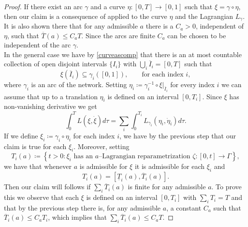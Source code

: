 \documentclass[11pt,a4paper,american]{article}
\newcommand{\ovI}{\overline I}
\newcommand{\ovT}{\overline T}
\begin{document}
    \begin{proof}
        If there exist an arc $\gamma$ and a curve $\eta:[0,T]\to[0,1]$ such that $\xi=\gamma\circ\eta$, then our claim is a consequence of \cite[Proposition 3.13 and Remark 3.17]{Davini07} applied to the curve $\eta$ and the Lagrangian $L_\gamma$. It is also shown there that for any admissible $a$ there is a $C_a>0$, independent of $\eta$, such that $\ovT(a)\le C_a T$. Since the arcs are finite $C_a$ can be chosen to be independent of the arc $\gamma$.\\
        In the general case we have by \cref{curveascomp} that there is an at most countable collection of open disjoint intervals $\{I_i\}$ with $\bigcup_i\ovI_i=[0,T]$ such that
        \begin{equation*}
            \xi\left(\ovI_i\right)\subseteq\gamma_i([0,1]),\qquad\text{for each index }i,
        \end{equation*}
        where $\gamma_i$ is an arc of the network. Setting $\eta_i\coloneqq\gamma^{-1}_i\circ\xi|_{\ovI_i}$ for every index $i$ we can assume that up to a translation $\eta_i$ is defined on an interval $[0,T_i]$. Since $\xi$ has non-vanishing derivative we get
        \begin{equation*}
            \int_0^T L\left(\xi,\dot\xi\right)d\tau=\sum_i\int_0^{T_i}L_{\gamma_i}(\eta_i,\dot\eta_i)d\tau.
        \end{equation*}
        If we define $\xi_i\coloneqq\gamma_i\circ\eta_i$ for each index $i$, we have by the previous step that our claim is true for each $\xi_i$. Moreover, setting
        \begin{equation*}
            T_i(a)\coloneqq\left\{t>0:\text{$\xi_i$ has an $a$--Lagrangian reparametrization $\zeta:[0,t]\to\Gamma$}\right\},
        \end{equation*}
        we have that whenever $a$ is admissible for $\xi$ it is admissible for each $\xi_i$ and
        \begin{equation*}
            T_i(a)=\left[\underline T_i(a),\ovT_i(a)\right].
        \end{equation*}
        Then our claim will follows if $\sum_i\ovT_i(a)$ is finite for any admissible $a$. To prove this we observe that each $\xi$ is defined on an interval $[0,T_i]$ with $\sum_i T_i=T$ and that by the previous step there is, for any admissible $a$, a constant $C_a$ such that $\ovT_i(a)\le C_a T_i$, which implies that $\sum_i\ovT_i(a)\le C_a T$.
    \end{proof}
\end{document}

